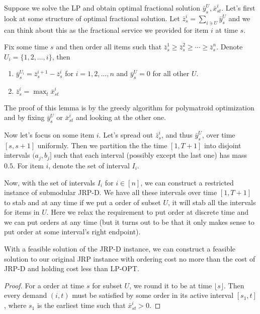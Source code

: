 Suppose we solve the LP and obtain optimal fractional solution $\bar y^U_s, \bar x^i_{st}$. Let's first look at some structure of optimal fractional solution. Let $\bar z^i_s = \sum_{i \ni U} \bar y^U_s$ and we can think about this as the fractional service we provided for item $i$ at time $s$.

\begin{lem}
Fix some time $s$ and then order all items such that $\bar z^1_s \ge \bar z^2_s \ge \cdots \ge \bar z^n_s$. Denote $U_i = \{1,2,\ldots, i\}$, then

\begin{enumerate}
\item $\bar y^{U_i}_s = \bar z^{i+1}_s - \bar z^i_s$ for $i=1,2,\ldots, n$ and $\bar y^U_s = 0$ for all other $U$.
\item $\bar z^i_s = \max_t \bar x^i_{st}$
\end{enumerate}
\end{lem}

The proof of this lemma is by the greedy algorithm for polymatroid optimization and by fixing $\bar y^U_s$ or $\bar x^i_{st}$ and looking at the other one.

Now let's focus on some item $i$. Let's spread out $\bar z^i_s$, and thus $\bar y^U_s$, over time $[s, s+1]$ uniformly. Then we partition the the time $[1, T+1]$ into disjoint intervals $(a_j, b_j]$ such that each interval (possibly except the last one) has mass $0.5$. For item $i$, denote the set of interval $I_i$.

Now, with the set of intervals $I_i$ for $i \in [n]$, we can construct a restricted instance of submodular JRP-D. We have all these intervals over time $[1, T+1]$ to stab and at any time if we put a order of subset $U$, it will stab all the intervals for items in $U$. Here we relax the requirement to put order at discrete time and we can put orders at any time (but it turns out to be that it only makes sense to put order at some interval's right endpoint).

\begin{lem}
With a feasible solution of the JRP-D instance, we can construct a feasible solution to our original JRP instance with ordering cost no more than the cost of JRP-D and holding cost less than LP-OPT.
\end{lem}
\begin{proof}
For a order at time $s$ for subset $U$, we round it to be at time $\lfloor s \rfloor$. Then every demand $(i,t)$ must be satisfied by some order in its active interval $[s_1, t]$, where $s_1$ is the earliest time such that $\bar x^i_{st} > 0$.
\end{proof}

